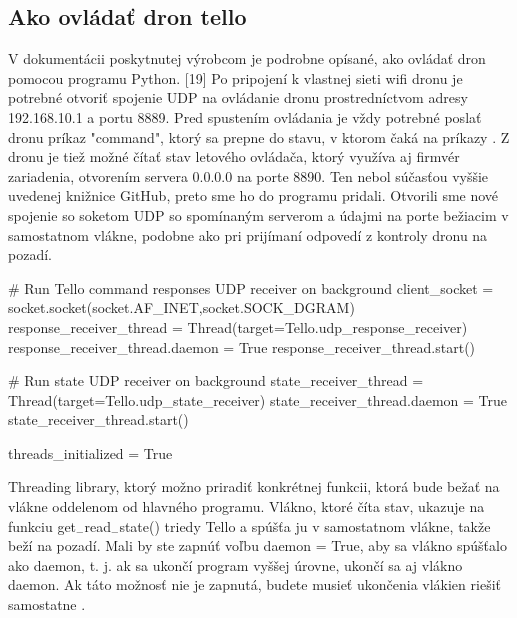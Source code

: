 \subsection{Ako ovládať dron tello}
V dokumentácii poskytnutej výrobcom je podrobne opísané, ako ovládať dron pomocou programu Python. [19] Po pripojení k vlastnej sieti wifi dronu je potrebné otvoriť spojenie UDP na ovládanie dronu prostredníctvom adresy 192.168.10.1 a portu 8889. Pred spustením ovládania je vždy potrebné poslať dronu príkaz "command", ktorý sa prepne do stavu, v ktorom čaká na príkazy \citep{TelloSDK}. 
Z dronu je tiež možné čítať stav letového ovládača, ktorý využíva aj firmvér zariadenia, otvorením servera 0.0.0.0 na porte 8890. Ten nebol súčasťou vyššie uvedenej knižnice GitHub, preto sme ho do programu pridali. Otvorili sme nové spojenie so soketom UDP so spomínaným serverom a údajmi na porte bežiacim v samostatnom vlákne, podobne ako pri prijímaní odpovedí z kontroly dronu na pozadí. 

\begin{mypython}[caption={Úryvok kódu 1 ukazuje obsluhu vlákna obsiahnutú v jazyku Python },label=SO-test]
    # Run Tello command responses UDP receiver on background
    client_socket = socket.socket(socket.AF_INET,socket.SOCK_DGRAM)
    response_receiver_thread = Thread(target=Tello.udp_response_receiver)
    response_receiver_thread.daemon = True
    response_receiver_thread.start()

    # Run state UDP receiver on background
    state_receiver_thread = Thread(target=Tello.udp_state_receiver)
    state_receiver_thread.daemon = True
    state_receiver_thread.start()

    threads_initialized = True
\end{mypython} 

 

Threading library, ktorý možno priradiť konkrétnej funkcii, 
ktorá bude bežať na vlákne oddelenom od hlavného programu. 
Vlákno, ktoré číta stav, ukazuje na funkciu get$_-$read$_-$state()
triedy Tello a spúšťa ju v samostatnom vlákne, takže beží na pozadí. Mali by ste zapnúť voľbu daemon = True, aby sa 
vlákno spúšťalo ako daemon, t. j. ak sa ukončí program vyššej úrovne, ukončí sa aj vlákno daemon. Ak táto možnosť nie 
je zapnutá, budete musieť ukončenia vlákien riešiť samostatne \citep{TelloSDK}.

